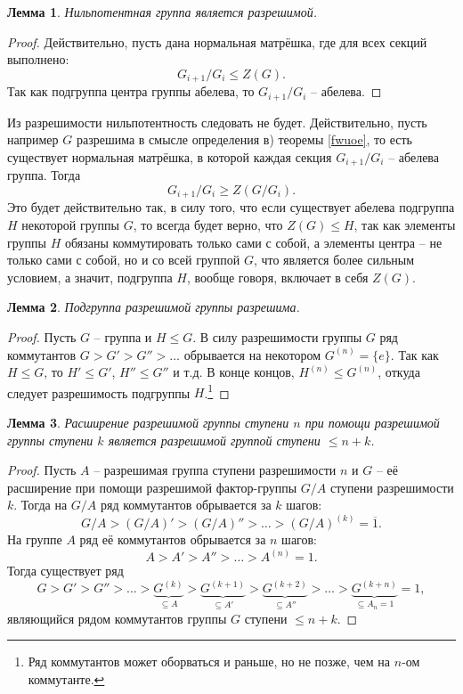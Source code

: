 \documentclass{article}
\newtheorem{lemma}{Лемма}[section]
\begin{document}
\begin{lemma}
    Нильпотентная группа является разрешимой.
\end{lemma}
\begin{proof}
    Действительно, пусть дана нормальная матрёшка, где для всех секций выполнено: $$ G_{i + 1} / G_i \leqslant Z(G). $$
    Так как подгруппа центра группы абелева, то $G_{i + 1} / G_i$ -- абелева.
\end{proof}

Из разрешимости нильпотентность следовать не будет. Действительно, пусть например $G$ разрешима в смысле определения в) теоремы \ref{fwuoe}, то есть существует нормальная матрёшка, в которой каждая секция $G_{i + 1} / G_i$ -- абелева группа. Тогда $$ G_{i + 1} / G_i \geqslant Z(G / G_i). $$ Это будет действительно так, в силу того, что если существует абелева подгруппа $H$ некоторой группы $G$, то всегда будет верно, что $Z(G) \leqslant H$, так как элементы группы $H$ обязаны коммутировать только сами с собой, а элементы центра -- не только сами с собой, но и со всей группой $G$, что является более сильным условием, а значит, подгруппа $H$, вообще говоря, включает в себя $Z(G)$.

\begin{lemma}
    Подгруппа разрешимой группы разрешима.
\end{lemma}
\begin{proof}
    Пусть $G$ -- группа и $H \leqslant G$. В силу разрешимости группы $G$ ряд коммутантов $G > G' > G'' > \ldots $ обрывается на некотором $G^{(n)} = \{ e \}$. Так как $H \leqslant G$, то $H' \leqslant G'$, $H'' \leqslant G''$ и т.д. В конце концов, $H^{(n)} \leqslant G^{(n)}$, откуда следует разрешимость подгруппы $H$.\footnote{Ряд коммутантов может оборваться и раньше, но не позже, чем на $n$-ом коммутанте.}
\end{proof}

\begin{lemma}
    Расширение разрешимой группы ступени $n$ при помощи разрешимой группы ступени $k$ является разрешимой группой ступени $\leqslant n + k$.
\end{lemma}
\begin{proof}
    Пусть $A$ -- разрешимая группа ступени разрешимости $n$ и $G$ -- её расширение при помощи разрешимой фактор-группы $G / A$ ступени разрешимости $k$. Тогда на $G / A$ ряд коммутантов обрывается за $k$ шагов:
    \[
        G/A > (G/A)' > (G/A)'' > \ldots > (G/A)^{(k)} = \overline{1}.
    \]
    На группе $A$ ряд её коммутантов обрывается за $n$ шагов:
    \[
        A > A' > A'' > \ldots > A^{(n)} = 1.
    \]
    Тогда существует ряд
    \[
        G > G' > G'' > \ldots > \underbrace{G^{(k)}}_{\subseteq A} > \underbrace{G^{(k + 1)}}_{\subseteq A'} > \underbrace{G^{(k + 2)}}_{\subseteq A''} > \ldots > \underbrace{G^{(k + n)}}_{\subseteq A_n = 1} = 1,
    \]
    являющийся рядом коммутантов группы $G$ ступени $\leqslant n + k$.
\end{proof}
\end{document}
